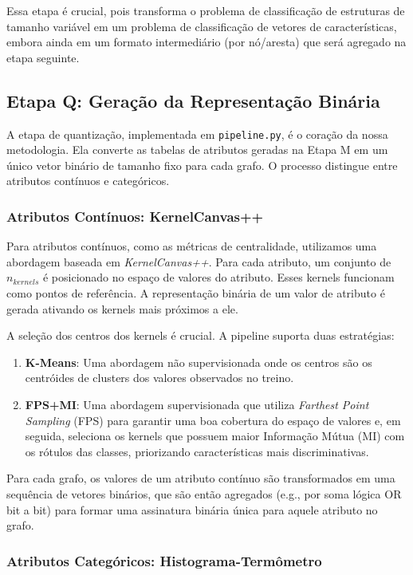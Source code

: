 \documentclass[12pt]{article}
\begin{document}
Essa etapa é crucial, pois transforma o problema de classificação de estruturas de tamanho variável em um problema de classificação de vetores de características, embora ainda em um formato intermediário (por nó/aresta) que será agregado na etapa seguinte.

\subsection{Etapa Q: Geração da Representação Binária}

A etapa de quantização, implementada em \texttt{pipeline.py}, é o coração da nossa metodologia. Ela converte as tabelas de atributos geradas na Etapa M em um único vetor binário de tamanho fixo para cada grafo. O processo distingue entre atributos contínuos e categóricos.

\subsubsection{Atributos Contínuos: KernelCanvas++}

Para atributos contínuos, como as métricas de centralidade, utilizamos uma abordagem baseada em \textit{KernelCanvas++}. Para cada atributo, um conjunto de $n_{kernels}$ é posicionado no espaço de valores do atributo. Esses kernels funcionam como pontos de referência. A representação binária de um valor de atributo é gerada ativando os kernels mais próximos a ele.

A seleção dos centros dos kernels é crucial. A pipeline suporta duas estratégias:
\begin{enumerate}
    \item \textbf{K-Means}: Uma abordagem não supervisionada onde os centros são os centróides de clusters dos valores observados no treino.
    \item \textbf{FPS+MI}: Uma abordagem supervisionada que utiliza \textit{Farthest Point Sampling} (FPS) para garantir uma boa cobertura do espaço de valores e, em seguida, seleciona os kernels que possuem maior Informação Mútua (MI) com os rótulos das classes, priorizando características mais discriminativas.
\end{enumerate}
Para cada grafo, os valores de um atributo contínuo são transformados em uma sequência de vetores binários, que são então agregados (e.g., por soma lógica OR bit a bit) para formar uma assinatura binária única para aquele atributo no grafo.

\subsubsection{Atributos Categóricos: Histograma-Termômetro}
\end{document}

